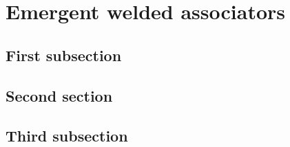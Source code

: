 \chapter{Emergent welded associators}

\section{First subsection}

\section{Second section}

\section{Third subsection}
